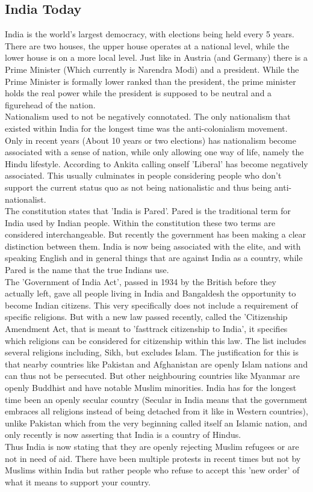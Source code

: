\documentclass{article}
\begin{document}
	\subsection{India Today}
	India is the world's largest democracy, with elections being held every 5 years. There are two houses, the upper house operates at a national level, while the lower house is on a more local level. Just like in Austria (and Germany) there is a Prime Minister (Which currently is Narendra Modi) and a president. While the Prime Minister is formally lower ranked than the president, the prime minister holds the real power while the president is supposed to be neutral and a figurehead of the nation. \\
	Nationalism used to not be negatively connotated. The only nationalism that existed within India for the longest time was the anti-colonialism movement. Only in recent years (About 10 years or two elections) has nationalism become associated with a sense of nation, while only allowing one way of life, namely the Hindu lifestyle. According to Ankita calling onself 'Liberal' has become negatively associated. This usually culminates in people considering people who don't support the current status quo as not being nationalistic and thus being anti-nationalist. \\
	The constitution states that 'India is Pared'. Pared is the traditional term for India used by Indian people. Within the constitution these two terms are considered interchangeable. But recently the government has been making a clear distinction between them. India is now being associated with the elite, and with speaking English and in general things that are against India as a country, while Pared is the name that the true Indians use. \\
	The 'Government of India Act', passed in 1934 by the British before they actually left, gave all people living in India and Bangaldesh the opportunity to become Indian citizens. This very specifically does not include a requirement of specific religions. But with a new law passed recently, called the 'Citizenship Amendment Act, that is meant to 'fasttrack citizenship to India', it specifies which religions can be considered for citizenship within this law. The list includes several religions including, Sikh, but excludes Islam. The justification for this is that nearby countries like Pakistan and Afghanistan are openly Islam nations and can thus not be persecuted. But other neighbouring countries like Myanmar are openly Buddhist and have notable Muslim minorities. India has for the longest time been an openly secular country (Secular in India means that the government embraces all religions instead of being detached from it like in Western countries), unlike Pakistan which from the very beginning called itself an Islamic nation, and only recently is now asserting that India is a country of Hindus. \\
	Thus India is now stating that they are openly rejecting Muslim refugees or are not in need of aid. There have been multiple protests in recent times but not by Muslims within India but rather people who refuse to accept this 'new order' of what it means to support your country. \\
\end{document}

